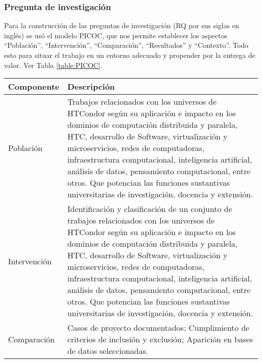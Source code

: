 \subsubsection{Pregunta de investigación}
Para la construcción de las preguntas de investigación (RQ por sus siglas en inglés) se usó el modelo PICOC, que nos permite establecer los aspectos ``Población'', ``Intervención'', ``Comparación'', ``Resultados'' y ``Contexto''. Todo esto para situar el trabajo en un entorno adecuado y propender por la entrega de valor. Ver Tabla \ref{table:PICOC}.

\begin{table}[htbp]
	
	\centering
	\renewcommand{\arraystretch}{1.7}  %
	\renewcommand{\tablename}{Tabla}  %
	\setlength{\tabcolsep}{3pt}      %
	\vspace{10pt}                     %
	\begin{tabular}{|>{\arraybackslash}m{1.7cm}|>{\arraybackslash}m{6.3cm}|}
		\hline	
		\textbf{Componente} & \textbf{Descripción} \\
		
		\hline
		Población & Trabajos relacionados con los universos de HTCondor según su aplicación e impacto en los dominios de computación distribuida y paralela, HTC, desarrollo de Software, virtualización y microservicios, redes de computadoras, infraestructura computacional, inteligencia artificial, análisis de datos, pensamiento computacional, entre otros. Que potencian las funciones sustantivas universitarias de investigación, docencia y extensión.\\
		
		\hline
		Intervención & Identificación y clasificación de un conjunto de trabajos relacionados con los universos de HTCondor según su aplicación e impacto en los dominios de computación distribuida y paralela, HTC, desarrollo de Software, virtualización y microservicios, redes de computadoras, infraestructura computacional, inteligencia artificial, análisis de datos, pensamiento computacional, entre otros. Que potencian las funciones sustantivas universitarias de investigación, docencia y extensión.\\
		
		\hline
		Comparación & Casos de proyecto documentados; Cumplimiento de criterios de inclusión y exclusión;
		Aparición en bases de datos seleccionadas.\\
		

\end{tabular}
\end{table}
